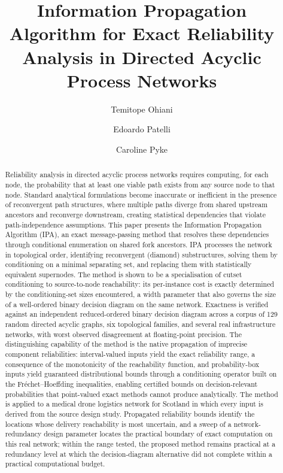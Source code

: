 \documentclass[preprint,12pt]{elsarticle}
\theoremstyle{definition}
\begin{document}
\begin{frontmatter}

\title{Information Propagation Algorithm for Exact Reliability Analysis in Directed Acyclic Process Networks}

\author[strath]{Temitope Ohiani}
\author[strath]{Edoardo Patelli}
\author[strath]{Caroline Pyke}
\address[strath]{University of Strathclyde, Glasgow, United Kingdom}

\begin{abstract}
Reliability analysis in directed acyclic process networks requires computing, for each node, the
probability that at least one viable path exists from any source node to that node. Standard analytical
formulations become inaccurate or inefficient in the presence of reconvergent path structures, where
multiple paths diverge from shared upstream ancestors and reconverge downstream, creating statistical
dependencies that violate path-independence assumptions.
This paper presents the Information Propagation Algorithm (IPA), an exact message-passing method that
resolves these dependencies through conditional enumeration on shared fork ancestors. IPA processes the
network in topological order, identifying reconvergent (diamond) substructures, solving them by
conditioning on a minimal separating set, and replacing them with statistically equivalent supernodes.
The method is shown to be a specialisation of cutset conditioning to source-to-node reachability: its
per-instance cost is exactly determined by the conditioning-set sizes encountered, a width parameter that
also governs the size of a well-ordered binary decision diagram on the same network. Exactness is
verified against an independent reduced-ordered binary decision diagram across a corpus of 129 random
directed acyclic graphs, six topological families, and several real infrastructure networks, with worst
observed disagreement at floating-point precision. The distinguishing capability of the method is the
native propagation of imprecise component reliabilities: interval-valued inputs yield the exact
reliability range, a consequence of the monotonicity of the reachability function, and probability-box
inputs yield guaranteed distributional bounds through a conditioning operator built on the
Fr\'echet--Hoeffding inequalities, enabling certified bounds on decision-relevant probabilities that
point-valued exact methods cannot produce analytically.
The method is applied to a medical drone logistics network for Scotland in which every input is derived
from the source design study. Propagated reliability bounds identify the locations whose delivery
reachability is most uncertain, and a sweep of a network-redundancy design parameter locates the
practical boundary of exact computation on this real network; within the range tested, the proposed
method remains practical at a redundancy level at which the decision-diagram alternative did not complete
within a practical computational budget.
\end{abstract}


\end{frontmatter}
\end{document}
